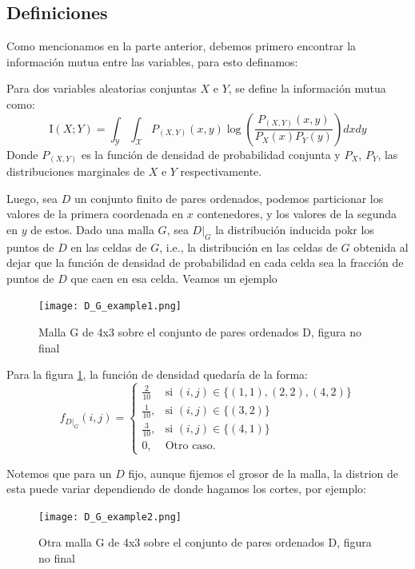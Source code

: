 \subsection{Definiciones}

	Como mencionamos en la parte anterior, debemos primero encontrar la informaci\'on mutua entre las variables, para esto definamos:

	\begin{defn}
		Para dos variables aleatorias conjuntas $X$ e $Y$, se define la informaci\'on mutua como:
		$$
		\mathrm{I}(X ; Y)=\int_{\mathcal{Y}} \int_{\mathcal{X}} P_{(X, Y)}(x, y) \log \left(\frac{P_{(X, Y)}(x, y)}{P_{X}(x) P_{Y}(y)}\right)dxdy
		$$
		Donde $P_{(X, Y)}$ es la funci\'on de densidad de probabilidad conjunta y $P_{X}$, $P_{Y}$, las distribuciones marginales de $X$ e $Y$ respectivamente. 
	\end{defn}

	Luego, sea $D$ un conjunto finito de pares ordenados, podemos particionar los valores de la primera coordenada en $x$ contenedores, y los valores de la segunda en $y$ de estos. Dado una malla $G$, sea $D|_G$ la distribuci\'on inducida pokr los puntos de $D$ en las celdas de $G$, i.e., la distribuci\'on en las celdas de $G$ obtenida al dejar que la funci\'on de densidad de probabilidad en cada celda sea la fracci\'on de puntos de $D$ que caen en esa celda. Veamos un ejemplo
	\begin{figure}[H]
		\centering
		\texttt{[image: D\_G\_example1.png]}
		\caption{Malla G de 4x3 sobre el conjunto de pares ordenados D, figura no final}
		\label{malla_G}
	\end{figure}

	Para la figura \ref{malla_G}, la funci\'on de densidad quedar\'ia de la forma:
	\[
		f_{D|_G}(i,j) = \left\{\begin{array}{lr}
			\frac{2}{10} & \text{si } (i,j) \in \{ (1,1), (2,2), (4,2)\} \\
			\frac{1}{10}, & \text{si }(i,j) \in \{ (3,2)\}  \\
			\frac{3}{10}, & \text{si }(i,j) \in \{ (4,1)\}  \\
			0, & \text{Otro caso.}
			\end{array}\right.
	\]



	Notemos que para un $D$ fijo, aunque fijemos el grosor de la malla, la distrion de esta puede variar dependiendo de donde hagamos los cortes, por ejemplo:

	\begin{figure}[H]
		\centering
		\texttt{[image: D\_G\_example2.png]}
		\caption{Otra malla G de 4x3 sobre el conjunto de pares ordenados D, figura no final}
		\label{malla_G_2}
	\end{figure}


